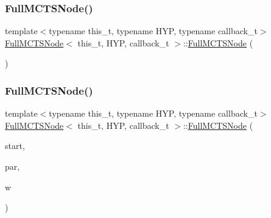 \subsubsection{\texorpdfstring{Full\+M\+C\+T\+S\+Node()}{FullMCTSNode()}\hspace{0.1cm}{\footnotesize\ttfamily [1/5]}}
{\footnotesize\ttfamily template$<$typename this\+\_\+t, typename H\+YP, typename callback\+\_\+t$>$ \\
\hyperlink{class_full_m_c_t_s_node}{Full\+M\+C\+T\+S\+Node}$<$ this\+\_\+t, H\+YP, callback\+\_\+t $>$\+::\hyperlink{class_full_m_c_t_s_node}{Full\+M\+C\+T\+S\+Node} (\begin{DoxyParamCaption}{ }\end{DoxyParamCaption})\hspace{0.3cm}{\ttfamily [inline]}}

\mbox{\label{class_full_m_c_t_s_node_af3859089eca5e60735212c979edd1bac}} 
\subsubsection{\texorpdfstring{Full\+M\+C\+T\+S\+Node()}{FullMCTSNode()}\hspace{0.1cm}{\footnotesize\ttfamily [2/5]}}
{\footnotesize\ttfamily template$<$typename this\+\_\+t, typename H\+YP, typename callback\+\_\+t$>$ \\
\hyperlink{class_full_m_c_t_s_node}{Full\+M\+C\+T\+S\+Node}$<$ this\+\_\+t, H\+YP, callback\+\_\+t $>$\+::\hyperlink{class_full_m_c_t_s_node}{Full\+M\+C\+T\+S\+Node} (\begin{DoxyParamCaption}\item[{H\+YP \&}]{start,  }\item[{this\+\_\+t $\ast$}]{par,  }\item[{size\+\_\+t}]{w }\end{DoxyParamCaption})\hspace{0.3cm}{\ttfamily [inline]}}

\mbox{\label{class_full_m_c_t_s_node_a92cfc5d971a4aa3b17cd8cc5f36424d6}} 
